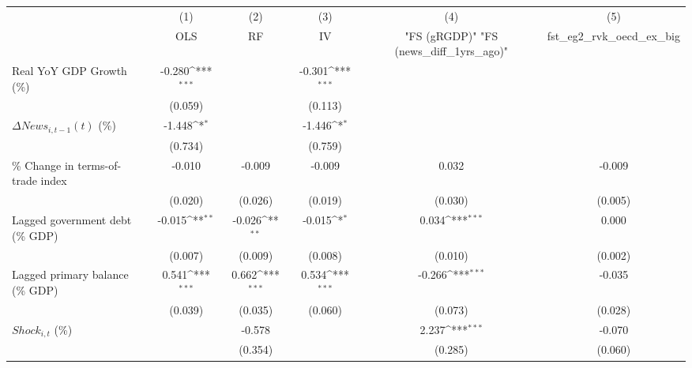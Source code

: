 {
\def\sym#1{\ifmmode^{#1}\else\(^{#1}\)\fi}
\begin{tabular}{l*{5}{c}}
\toprule
                    &\multicolumn{1}{c}{(1)}&\multicolumn{1}{c}{(2)}&\multicolumn{1}{c}{(3)}&\multicolumn{1}{c}{(4)}&\multicolumn{1}{c}{(5)}\\
                    &\multicolumn{1}{c}{OLS}&\multicolumn{1}{c}{RF}&\multicolumn{1}{c}{IV}&\multicolumn{1}{c}{ "FS (gRGDP)"  "FS (news_diff_1yrs_ago)" }&\multicolumn{1}{c}{fst_eg2_rvk_oecd_ex_big}\\
\midrule
Real YoY GDP Growth (\%)&      -0.280\sym{***}&                     &      -0.301\sym{***}&                     &                     \\
                    &     (0.059)         &                     &     (0.113)         &                     &                     \\
\addlinespace
$ \Delta News_{i,t-1}(t)$ (\%)&      -1.448\sym{*}  &                     &      -1.446\sym{*}  &                     &                     \\
                    &     (0.734)         &                     &     (0.759)         &                     &                     \\
\addlinespace
\% Change in terms-of-trade index&      -0.010         &      -0.009         &      -0.009         &       0.032         &      -0.009         \\
                    &     (0.020)         &     (0.026)         &     (0.019)         &     (0.030)         &     (0.005)         \\
\addlinespace
Lagged government debt (\% GDP)&      -0.015\sym{**} &      -0.026\sym{**} &      -0.015\sym{*}  &       0.034\sym{***}&       0.000         \\
                    &     (0.007)         &     (0.009)         &     (0.008)         &     (0.010)         &     (0.002)         \\
\addlinespace
Lagged primary balance (\% GDP)&       0.541\sym{***}&       0.662\sym{***}&       0.534\sym{***}&      -0.266\sym{***}&      -0.035         \\
                    &     (0.039)         &     (0.035)         &     (0.060)         &     (0.073)         &     (0.028)         \\
\addlinespace
$ Shock_{i,t}$ (\%) &                     &      -0.578         &                     &       2.237\sym{***}&      -0.070         \\
                    &                     &     (0.354)         &                     &     (0.285)         &     (0.060)         \\

\end{tabular}}
